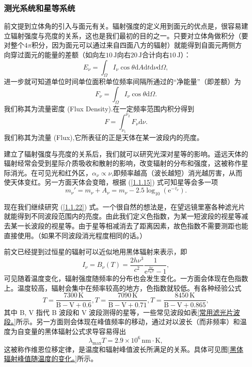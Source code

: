 \documentclass[../天体物理基础.tex]{subfiles}
\begin{document}
\subsubsection{测光系统和星等系统}
前文提到立体角的引入与面元有关。辐射强度的定义用到面元的优点是，很容易建立辐射强度与亮度的关系，这也是我们最初的目的之一。只要对立体角做积分（要对整个$4\pi$积分，因为面元可以通过来自四面八方的辐射）就能得到自面元两侧方向穿过面元的能量的差额（如向左$10\,\mathrm{J}$向右$20\,\mathrm{J}$合计向右$10\,\mathrm{J}$）：
\begin{equation}
E_{\nu}=\int_{\Omega}I_{\nu}\cos\theta\mathrm{d}A\mathrm{d}t\mathrm{d}\nu\mathrm{d}\Omega,
\end{equation}
进一步就可知道单位时间单位面积单位频率间隔所通过的“净能量”（即差额）为
\begin{equation}
F_{\nu}=\int_{\Omega}I_{\nu}\cos\theta\mathrm{d}\Omega.
\end{equation}
我们称其为流量密度 (Flux Density).在一定频率范围内积分得到
\begin{equation}
F=\int_{\nu_{1}}^{\nu_{2}}F_{\nu}\mathrm{d}\nu.\label{1.1.22}
\end{equation}
我们称其为流量 (Flux),它所表征的正是天体在某一波段内的亮度。

建立了辐射强度与亮度的关系后，我们就可以研究光深对星等的影响。遥远天体的辐射经常会受到星际介质吸收和散射的影响，改变辐射的分布和强度，这被称作星际消光。在可见光和红外区，$\alpha_{\nu}\propto{}\nu$,即频率越高（波长越短）消光越厉害，从而使天体变红。另一方面天体会变暗，根据 (\ref{1.1.15}) 式可知星等会多一项
\begin{equation}
m_{\nu}'=m_{\nu}+A_{\nu}=m_{\nu}-2.5\log_{10}\left(\mathrm{e}^{-\tau_{\nu}}\right).
\end{equation}

现在我们继续研究 (\ref{1.1.22}) 式。一个很自然的想法是，在望远镜里塞各种滤光片就能得到不同波段范围内的亮度。由此我们定义色指数，为某一短波段的视星等减去某一长波段的视星等。由于星等相减消去了距离因素，故色指数不需要测距也能直接使用。（如果不同波段消光程度相同的话。）

前文已经提到过恒星的辐射可以近似地用黑体辐射来表示，即
\begin{equation}
I_{\nu}=B_{\nu}\left(T\right)=\frac{2h\nu^{3}}{c^{2}}\frac{1}{\mathrm{e}^{\frac{h\nu}{k_{\text{B}}T}}-1},
\end{equation}
可见随着温度变化，辐射强度随频率的分布也会发生变化。一方面会体现在色指数上。温度较高，辐射会集中在频率较高的地方，色指数就较低。有各种经验公式
\begin{equation}
T=\frac{7300\,\mathrm{K}}{\mathrm{B-V}+0.6},T=\frac{7090\,\mathrm{K}}{\mathrm{B-V}+0.71},T=\frac{8450\,\mathrm{K}}{\mathrm{B-V}+0.865},
\end{equation}
其中 B, V 指代 B 波段和 V 波段测得的星等，一些常见波段如表\ref{常用滤光片波段。}所示。另一方面则会体现在峰值频率的移动，通过对以波长（而非频率）和温度为自变量的黑体辐射公式求导容易得出
\begin{equation}
\lambda_{\max}T=2.9\times10^{6}\,\mathrm{nm\cdot K},
\end{equation}
这被称作维恩位移定律，是温度和辐射峰值波长所满足的关系。具体可见图\ref{黑体辐射峰值随温度的变化。}所示。
\end{document}
